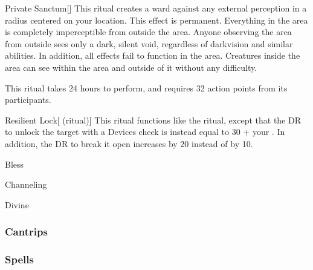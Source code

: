 \lowercase{\hypertarget{spell:Private Sanctum}{}}\label{spell:Private Sanctum}
\begin{freeability}[\nth{4}]{\hypertarget{spell:Private Sanctum}{Private Sanctum}}[]
This ritual creates a ward against any external perception in a \arealarge radius  centered on your location.
This effect is permanent.
Everything in the area is completely imperceptible from outside the area.
Anyone observing the area from outside sees only a dark, silent void, regardless of darkvision and similar abilities.
In addition, all  effects fail to function in the area.
Creatures inside the area can see within the area and outside of it without any difficulty.

This ritual takes 24 hours to perform, and requires 32 action points from its participants.
\end{freeability}
\vspace{0.25em}



\lowercase{\hypertarget{spell:Resilient Lock}{}}\label{spell:Resilient Lock}
\begin{attuneability}[\nth{4}]{\hypertarget{spell:Resilient Lock}{Resilient Lock}}[ (ritual)]
This ritual functions like the  ritual, except that the DR to unlock the target with a Devices check is instead equal to 30 + your .
In addition, the DR to break it open increases by 20 instead of by 10.
\end{attuneability}
\vspace{0.25em}


\newpage
\begin{spellsection}{Bless}

\begin{spellheader}
\end{spellheader}


 Channeling

 Divine

\subsubsection{Cantrips}


\end{spellsection}


\subsubsection{Spells}


